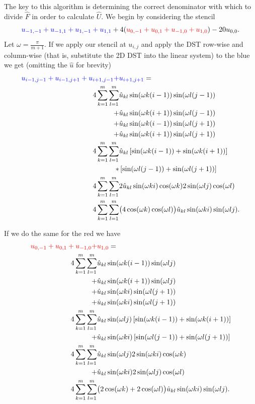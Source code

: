 \documentclass[12pt]{article}
\begin{document}
The key to this algorithm is determining the correct denominator with which to divide $\hat{F}$ in order to calculate $\hat{U}$. We begin by considering the stencil
$$
{\color{blue}u_{-1,-1}+u_{-1,1}+u_{1,-1}+u_{1,1}}+ 4({\color{red}u_{0,-1}+u_{0,1}+u_{-1,0}+u_{1,0}}) - 20 u_{0,0}.
$$
Let $\omega = \frac{\pi}{m+1}$. If we apply our stencil at $u_{i,j}$ and apply the DST row-wise and column-wise (that is, substitute the 2D DST into the linear system) to the {\color{blue}blue} we get (omitting the $\hat{u}$ for brevity)
\begin{align*}
{\color{blue}u_{i-1,j-1}+u_{i-1,j+1}+u_{i+1,j-1}+}&{\color{blue}u_{i+1,j+1}} = \\
4\sum_{k=1}^m\sum_{l=1}^m & \hat{u}_{kl}\sin(\omega k(i-1))\sin(\omega l(j-1)) \\
					   + & \hat{u}_{kl}\sin(\omega k(i+1))\sin(\omega l(j-1)) \\
					   + & \hat{u}_{kl}\sin(\omega k(i-1))\sin(\omega l(j+1)) \\
					   + & \hat{u}_{kl}\sin(\omega k(i+1))\sin(\omega l(j+1)) \\
4\sum_{k=1}^m\sum_{l=1}^m & \hat{u}_{kl}\left[ \sin(\omega k(i-1)) + \sin(\omega k(i+1)) \right]\\
					   * & \left[ \sin(\omega l(j-1)) + \sin(\omega l(j+1)) \right]\\
4\sum_{k=1}^m\sum_{l=1}^m & 2\hat{u}_{kl}\sin(\omega ki)\cos(\omega k)2\sin(\omega lj)\cos(\omega l) \\
4\sum_{k=1}^m\sum_{l=1}^m & \big(4\cos(\omega k)\cos(\omega l) \big)\hat{u}_{kl}\sin(\omega ki)\sin(\omega lj) .
\end{align*}

If we do the same for the {\color{red}red} we have
\begin{align*}
{\color{red}u_{0,-1}+u_{0,1}+u_{-1,0}+}&{\color{red}u_{1,0}}  = \\
4\sum_{k=1}^m\sum_{l=1}^m & \hat{u}_{kl}\sin(\omega k(i-1))\sin(\omega lj) \\
					   + & \hat{u}_{kl}\sin(\omega k(i+1))\sin(\omega lj) \\
					   + & \hat{u}_{kl}\sin(\omega ki)\sin(\omega l(j+1)) \\
					   + & \hat{u}_{kl}\sin(\omega ki)\sin(\omega l(j+1)) \\
4\sum_{k=1}^m\sum_{l=1}^m & \hat{u}_{kl}\sin(\omega lj) \left[ \sin(\omega k(i-1)) + \sin(\omega k(i+1)) \right]\\
					   + & \hat{u}_{kl}\sin(\omega ki) \left[ \sin(\omega l(j-1)) + \sin(\omega l(j+1)) \right] \\
4\sum_{k=1}^m\sum_{l=1}^m & \hat{u}_{kl}\sin(\omega lj) 2\sin(\omega ki) \cos(\omega k) \\
                       + & \hat{u}_{kl}\sin(\omega ki) 2\sin(\omega lj) \cos(\omega l) \\
4\sum_{k=1}^m\sum_{l=1}^m & \big(2\cos(\omega k)+2\cos(\omega l) \big)\hat{u}_{kl}\sin(\omega ki)\sin(\omega lj).      
\end{align*}
\end{document}
